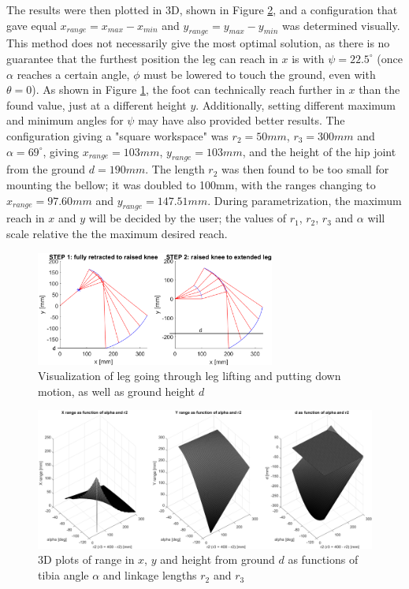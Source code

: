 The results were then plotted in 3D, shown in Figure \ref{fig:linkage_optimization}, and a configuration that gave equal $x_{range} = x_{max} - x_{min}$ and $y_{range} = y_{max} - y_{min}$ was determined visually.
This method does not necessarily give the most optimal solution, as there is no guarantee that the furthest position the leg can reach in $x$ is with $\psi = 22.5^{\circ}$ (once $\alpha$ reaches a certain angle, $\phi$ must be lowered to touch the ground, even with $\theta = 0$).
As shown in Figure \ref{fig:linkage_optimization_steps}, the foot can technically reach further in $x$ than the found value, just at a different height $y$.
Additionally, setting different maximum and minimum angles for $\psi$ may have also provided better results.
The configuration giving a "square workspace" was $r_2=50mm$, $r_3=300mm$ and $\alpha=69^{\circ}$, giving $x_{range} = 103mm$, $y_{range} = 103mm$, and the height of the hip joint from the ground $d=190mm$.
The length $r_2$ was then found to be too small for mounting the bellow; it was doubled to 100mm, with the ranges changing to $x_{range}=97.60mm$ and $y_{range}=147.51mm$.
During parametrization, the maximum reach in $x$ and $y$ will be decided by the user; the values of $r_1$, $r_2$, $r_3$ and $\alpha$ will scale relative the the maximum desired reach.

\begin{figure}
    \centering
    \includegraphics[width=0.7\textwidth]{3_SystemModelling/img/LinkageOptimizationSteps.png}
    \caption{Visualization of leg going through leg lifting and putting down motion, as well as ground height $d$}
    \label{fig:linkage_optimization_steps}
\end{figure}{}

\begin{figure}
    \centering
    \includegraphics[width=\textwidth]{3_SystemModelling/img/LinkageOptimization3D.png}
    \caption{3D plots of range in $x$, $y$ and height from ground $d$ as functions of tibia angle $\alpha$ and linkage lengths $r_2$ and $r_3$}
    \label{fig:linkage_optimization}
\end{figure}{}


